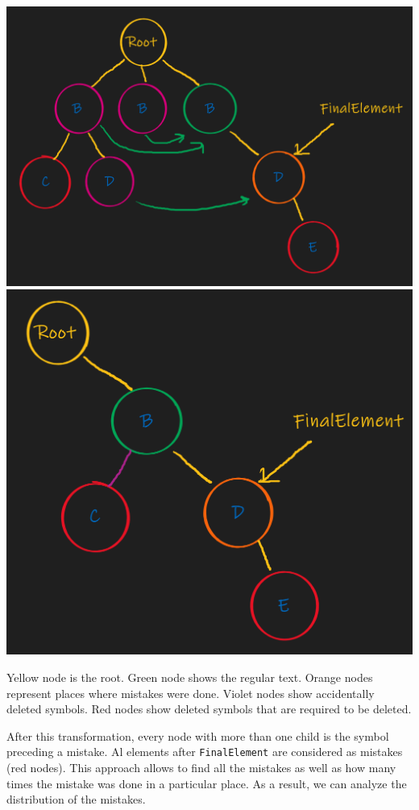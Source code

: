 \documentclass{article}
\begin{document}
\begin{center}
\includegraphics[scale = 0.4]{Figures/TreePrimitives5a.png}
\includegraphics[scale = 0.4]{Figures/TreePrimitives6a.png}

Yellow node is the root. Green node shows the regular text. Orange nodes represent places where mistakes were done. Violet nodes show accidentally deleted symbols. Red nodes show deleted symbols that are required to be deleted.
\end{center}
After this transformation, every node with more than one child is the symbol preceding a mistake. Al elements after \verb"FinalElement" are considered as mistakes (red nodes). This approach allows to find all the mistakes as well as how many times the mistake was done in a particular place. As a result, we can analyze the distribution of the mistakes.
\end{document}
